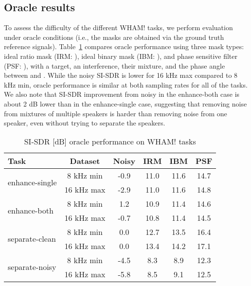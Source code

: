 \documentclass[a4paper]{article}
\begin{document}
\subsection{Oracle results}

To assess the difficulty of the different WHAM! tasks, we perform evaluation under oracle conditions (i.e., the masks are obtained via the ground truth reference signals).  Table~\ref{table:oracle} compares oracle performance using three mask types: ideal ratio mask (IRM: ), ideal binary mask (IBM: ), and phase sensitive filter (PSF: ), with  a target,  an interference,  their mixture, and  the phase angle between  and .  While the noisy SI-SDR is lower for 16 kHz max compared to 8 kHz min, oracle performance is similar at both sampling rates for all of the tasks.  We also note that SI-SDR improvement from noisy in the enhance-both case is about 2 dB lower than in the enhance-single case, suggesting that removing noise from mixtures of multiple speakers is harder than removing noise from one speaker, even without trying to separate the speakers.

\begin{table}[htbp]
    \footnotesize
    \caption{SI-SDR [dB] oracle performance on WHAM! tasks}\vspace{-0.6cm}
    \begin{center}
      \label{table:oracle}
      \begin{tabular}{lccccc}\hline
        Task & Dataset & Noisy & IRM & IBM & PSF \\ \hline \hline
        \multirow{2}{*}{enhance-single} & \phantom{1}8 kHz min & -0.9 & 11.0 & 11.6 & 14.7  \\
         & 16 kHz max & -2.9 & 11.0 & 11.6 & 14.8  \\ \hline
        \multirow{2}{*}{enhance-both} & \phantom{1}8 kHz min & \phantom{-}1.2 & 10.9 & 11.4 & 14.6 \\ 
         & 16 kHz max & -0.7 & 10.8 & 11.4 & 14.5  \\ \hline
        \multirow{2}{*}{separate-clean} & \phantom{1}8 kHz min & \phantom{-}0.0 & 12.7 & 13.5 & 16.4 \\ 
         & 16 kHz max & \phantom{-}0.0 & 13.4 & 14.2  & 17.1\\ \hline
        \multirow{2}{*}{separate-noisy} & \phantom{1}8 kHz min & -4.5 & \phantom{1}8.3 & \phantom{1}8.9  & 12.3 \\ 
         & 16 kHz max & -5.8 & \phantom{1}8.5 & \phantom{1}9.1  & 12.5 \\ \hline
      \end{tabular}\vspace{-.7cm}
    \end{center}
  \end{table}
\end{document}

